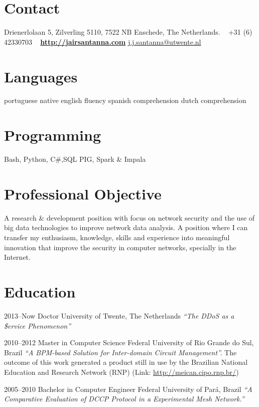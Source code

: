 \documentclass[print]{friggeri-cv} %
\begin{document}

\begin{aside} %
\section{Contact}
Drienerlolaan 5,
Zilverling 5110,
7522 NB Enschede,
The Netherlands.
~
+31 (6) 42330703
~
\href{http://jairsantanna.com}{\textbf{http://jairsantanna.com}}
\href{mailto:j.j.santanna@utwente.nl}{j.j.santanna@utwente.nl}
\section{Languages}
portuguese native 
english fluency
spanish comprehension
dutch comprehension
\section{Programming}
Bash, Python, C\#,SQL
PIG, Spark \& Impala
\end{aside}

\section{Professional Objective}
A research \& development position with focus on network security and the use of big data technologies to improve  network data analysis. A position where I can transfer my enthusiasm, knowledge, skills and experience into meaningful innovation that improve the security in computer networks, specially in the Internet. 

\section{Education}

\begin{entrylist}

\vspace{-0.3cm}
\entry
{2013--Now}
{Doctor}
{University of Twente, The Netherlands}
{\emph{``The DDoS as a \$ervice Phenomenon''} \\ 
}	

\entry
{2010--2012}
{Master {\normalfont in Computer Science}}
{Federal University of Rio Grande do Sul, Brazil}
{\emph{``A BPM-based Solution for Inter-domain Circuit Management''.} The outcome of this work generated a product still in use by the Brazilian National Education and Research Network (RNP) (Link: \href{http://meican.cipo.rnp.br/}{http://meican.cipo.rnp.br/})}

\entry
{2005--2010}
{Bachelor {\normalfont in Computer Engineer}}
{Federal University of Par\'a, Brazil}
{\emph{``A Comparative Evaluation of DCCP Protocol in a Experimental Mesh Network.''} \\ 
}

\end{entrylist}
\end{document}
